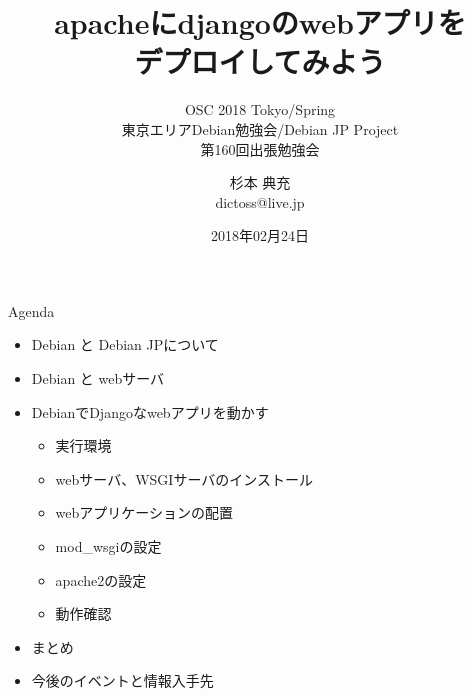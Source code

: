 \title{apacheにdjangoのwebアプリを\\デプロイしてみよう}
\subtitle{OSC 2018 Tokyo/Spring\\東京エリアDebian勉強会/Debian JP Project\\第160回出張勉強会}
\author{杉本 典充\\ dictoss@live.jp}
\date{2018年02月24日}



\begin{frame}
\titlepage{}
\end{frame}

\begin{frame}{Agenda}
  \begin{itemize}
  \item Debian と Debian JPについて
  \item Debian と webサーバ
  \item DebianでDjangoなwebアプリを動かす
    \begin{itemize}
    \item 実行環境
    \item webサーバ、WSGIサーバのインストール
    \item webアプリケーションの配置
    \item mod\_wsgiの設定
    \item apache2の設定
    \item 動作確認
    \end{itemize}
  \item まとめ
  \item 今後のイベントと情報入手先
  \end{itemize}
\end{frame}

